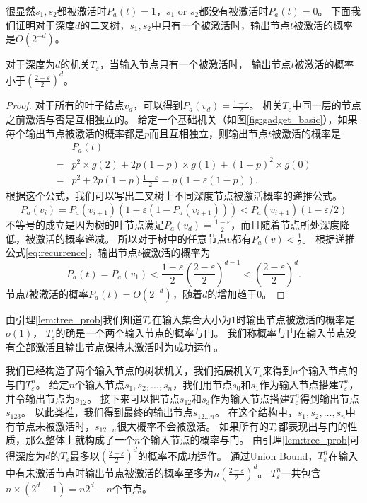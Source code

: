 很显然$s_1,s_2$都被激活时$P_a(t)=1$，$s_1$ or $s_2$都没有被激活时$P_a(t)=0$。
下面我们证明对于深度$d$的二叉树，$s_1,s_2$中只有一个被激活时，输出节点$t$被激活的概率是$O(2^{-d})$。
\begin{lemma}
\label{lem:tree_prob}
对于深度为$d$的机关$T_\varepsilon$，当输入节点只有一个被激活时，
输出节点$t$被激活的概率小于$(\frac{2-\varepsilon}{2})^{d}$。
\end{lemma}
\begin{proof}
对于所有的叶子结点$v_d$，可以得到$P_a(v_d) = \frac{1-\varepsilon}{2}$。
机关$T_\varepsilon$中同一层的节点之前激活与否是互相独立的。
给定一个基础机关（如图\ref{fig:gadget_basic}），如果每个输出节点被激活的概率都是$p$而且互相独立，则输出节点$t$被激活的概率是
\begin{equation*}
\begin{array}{ll}
& P_a(t) \\
= & p^2\times g(2) + 2p(1-p)\times g(1) + (1-p)^2\times g(0) \\
= & p^2 + 2p(1-p)\frac{1-\varepsilon}{2} = p(1-\varepsilon(1-p)).
\end{array}
\end{equation*}
根据这个公式，我们可以写出二叉树上不同深度节点被激活概率的递推公式。
\begin{equation}
\label{eq:recurrence}
P_a(v_i) = P_a(v_{i+1})(1-\varepsilon(1-P_a(v_{i+1}))) <  P_a(v_{i+1})(1-\varepsilon/2)
\end{equation}
不等号的成立是因为树的叶节点满足$P_a(v_d) = \frac{1-\varepsilon}{2}$，而且随着节点所处深度降低，被激活的概率递减。
所以对于树中的任意节点$v$都有$P_a(v) < \frac{1}{2}$。
根据递推公式\ref{eq:recurrence}，输出节点$t$被激活的概率为
\begin{equation*}
\label{eq:p_a_t}
 P_a(t) 
=  P_a(v_1) 
<  \frac{1-\varepsilon}{2}(\frac{2-\varepsilon}{2})^{d-1} 
<  (\frac{2-\varepsilon}{2})^{d}.
\end{equation*}
节点$t$被激活的概率$P_a(t) = O(2^{-d})$，随着$d$的增加趋于$0$。
\end{proof}
由引理\ref{lem:tree_prob}我们知道$T_\varepsilon$在输入集合大小为$1$时输出节点被激活的概率是$o(1)$，
$T_\varepsilon$的确是一个两个输入节点的概率与门。
我们称概率与门在输入节点没有全部激活且输出节点保持未激活时为成功运作。


我们已经构造了两个输入节点的树状机关，我们拓展机关$T_\varepsilon$来得到$n$个输入节点的与门$T_\varepsilon^n$。
给定$n$个输入节点$s_1, s_2, \dots, s_n$，我们用节点$s_0$和$s_1$作为输入节点搭建$T_\varepsilon^n$，并令输出节点为$s_{12}$。
接下来可以把节点$s_{12}$和$s_{3}$作为输入节点搭建$T_\varepsilon^n$得到输出节点$s_{123}$。
以此类推，我们得到最终的输出节点$s_{12\dots n}$。
在这个结构中，$s_1, s_2, \dots, s_n$中有节点未被激活时，$s_{12\dots n}$很大概率不会被激活。
如果所有的$T_\varepsilon$都表现出与门的性质，那么整体上就构成了一个$n$个输入节点的概率与门。
由引理\ref{lem:tree_prob}可得深度为$d$的$T_\varepsilon$最多以$(\frac{2-\varepsilon}{2})^{d}$的概率不成功运作。
通过Union Bound，$T_\varepsilon^n$在输入中有未激活节点时输出节点被激活的概率至多为$n(\frac{2-\varepsilon}{2})^{d}$。
$T_\varepsilon^n$一共包含$n\times(2^d-1) = n2^d-n$个节点。



